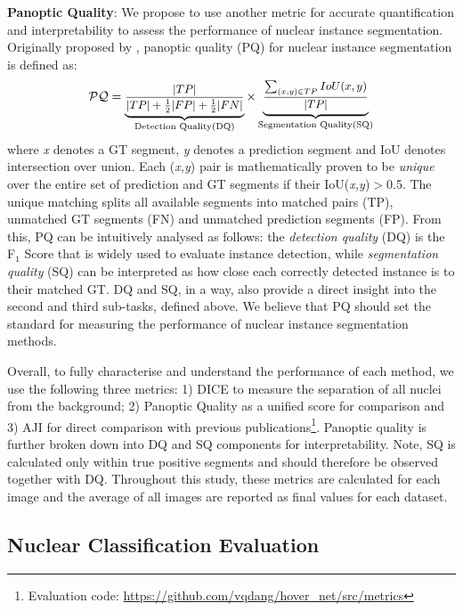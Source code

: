 \documentclass[journal]{IEEEtran}
\begin{document}
	\textbf{Panoptic Quality}: We propose to use another metric for accurate quantification and interpretability to assess the performance of nuclear instance segmentation. Originally proposed by \cite{kirilov2018panoptic_quality}, panoptic quality (PQ) for nuclear instance segmentation is defined as:
	\begin{equation}
	\small
	\mathcal{PQ}= 
	\underbrace{\frac{|TP|}{|TP|+\frac{1}{2}|FP|+\frac{1}{2}|FN|}}_{\text{Detection Quality(DQ)}}
	\times
	\underbrace{{\frac{\sum_{(x,y)\in{TP}}{IoU(x,y)}}{|TP|}}}_{\text{Segmentation Quality(SQ)}}
	\end{equation}
	where \textit{x} denotes a GT segment, \textit{y} denotes a prediction segment and IoU denotes intersection over union. Each (\textit{x,y}) pair is mathematically proven to be \textit{unique} \cite{kirilov2018panoptic_quality} over the entire set of prediction and GT segments if their IoU(\textit{x,y})$>$0.5. The unique matching splits all available segments into matched pairs (TP), unmatched GT segments (FN) and unmatched prediction segments (FP). From this, PQ can be intuitively analysed as follows: the \textit{detection quality} (DQ) is the F$_1$ Score that is widely used to evaluate instance detection, while \textit{segmentation quality} (SQ) can be interpreted as how close each correctly detected instance is to their matched GT. DQ and SQ, in a way, also provide a direct insight into the second and third sub-tasks, defined above. We believe that PQ should set the standard for measuring the performance of nuclear instance segmentation methods.
	
    Overall, to fully characterise and understand the performance of each method, we use the following three metrics: 1) DICE to measure the separation of all nuclei from the background; 2) Panoptic Quality as a unified score for comparison and 3) AJI for direct comparison with previous publications\footnote{Evaluation code:  \url{https://github.com/vqdang/hover\_net/src/metrics}}. Panoptic quality is further broken down into DQ and SQ components for interpretability. Note, SQ is calculated only within true positive segments and should therefore be observed together with DQ. Throughout this study, these metrics are calculated for each image and the average of all images are reported as final values for each dataset.
    \subsection{Nuclear Classification Evaluation} \label{section:metrics_class}
   
\end{document}
